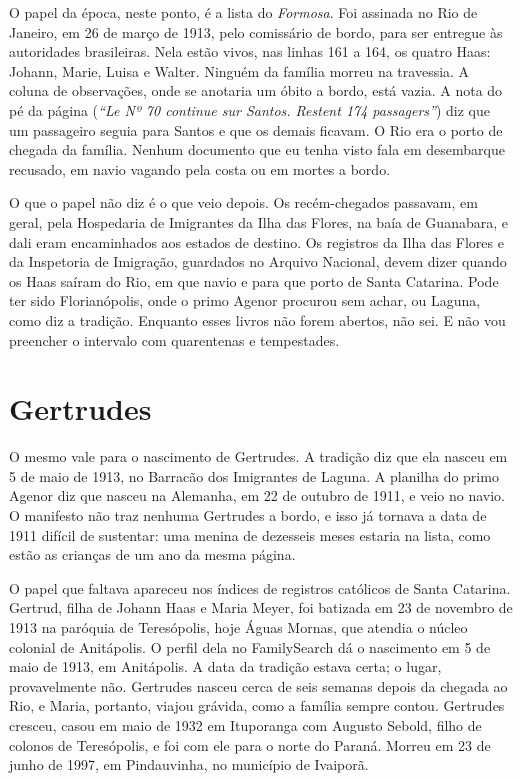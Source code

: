 \documentclass[
  brazilian,
  11pt,
  openany]{book}
\begin{document}
O papel da época, neste ponto, é a lista do \emph{Formosa}. Foi assinada
no Rio de Janeiro, em 26 de março de 1913, pelo comissário de bordo,
para ser entregue às autoridades brasileiras. Nela estão vivos, nas
linhas 161 a 164, os quatro Haas: Johann, Marie, Luisa e Walter. Ninguém
da família morreu na travessia. A coluna de observações, onde se
anotaria um óbito a bordo, está vazia. A nota do pé da página
(\emph{``Le Nº 70 continue sur Santos. Restent 174 passagers''}) diz que
um passageiro seguia para Santos e que os demais ficavam. O Rio era o
porto de chegada da família. Nenhum documento que eu tenha visto fala em
desembarque recusado, em navio vagando pela costa ou em mortes a bordo.

O que o papel não diz é o que veio depois. Os recém-chegados passavam,
em geral, pela Hospedaria de Imigrantes da Ilha das Flores, na baía de
Guanabara, e dali eram encaminhados aos estados de destino. Os registros
da Ilha das Flores e da Inspetoria de Imigração, guardados no Arquivo
Nacional, devem dizer quando os Haas saíram do Rio, em que navio e para
que porto de Santa Catarina. Pode ter sido Florianópolis, onde o primo
Agenor procurou sem achar, ou Laguna, como diz a tradição. Enquanto
esses livros não forem abertos, não sei. E não vou preencher o intervalo
com quarentenas e tempestades.

\section{Gertrudes}\label{gertrudes}

O mesmo vale para o nascimento de Gertrudes. A tradição diz que ela
nasceu em 5 de maio de 1913, no Barracão dos Imigrantes de Laguna. A
planilha do primo Agenor diz que nasceu na Alemanha, em 22 de outubro de
1911, e veio no navio. O manifesto não traz nenhuma Gertrudes a bordo, e
isso já tornava a data de 1911 difícil de sustentar: uma menina de
dezesseis meses estaria na lista, como estão as crianças de um ano da
mesma página.

O papel que faltava apareceu nos índices de registros católicos de Santa
Catarina. Gertrud, filha de Johann Haas e Maria Meyer, foi batizada em
23 de novembro de 1913 na paróquia de Teresópolis, hoje Águas Mornas,
que atendia o núcleo colonial de Anitápolis. O perfil dela no
FamilySearch dá o nascimento em 5 de maio de 1913, em Anitápolis. A data
da tradição estava certa; o lugar, provavelmente não. Gertrudes nasceu
cerca de seis semanas depois da chegada ao Rio, e Maria, portanto,
viajou grávida, como a família sempre contou. Gertrudes cresceu, casou
em maio de 1932 em Ituporanga com Augusto Sebold, filho de colonos de
Teresópolis, e foi com ele para o norte do Paraná. Morreu em 23 de junho
de 1997, em Pindauvinha, no município de Ivaiporã.
\end{document}
